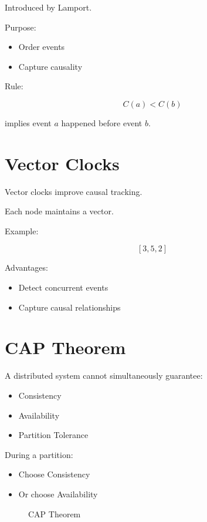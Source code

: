 Introduced by Lamport.

Purpose:

\begin{itemize}
\item Order events
\item Capture causality
\end{itemize}

Rule:

\[
C(a) < C(b)
\]

implies event \(a\) happened before event \(b\).

\section{Vector Clocks}

Vector clocks improve causal tracking.

Each node maintains a vector.

Example:

\[
[3,5,2]
\]

Advantages:

\begin{itemize}
\item Detect concurrent events
\item Capture causal relationships
\end{itemize}

\section{CAP Theorem}

A distributed system cannot simultaneously guarantee:

\begin{itemize}
\item Consistency
\item Availability
\item Partition Tolerance
\end{itemize}

During a partition:

\begin{itemize}
\item Choose Consistency
\item Or choose Availability
\end{itemize}

\begin{figure}[H]
\centering
{}
\caption{CAP Theorem}
\end{figure}

